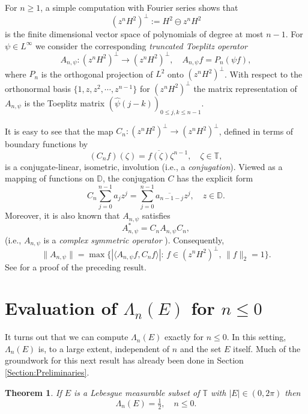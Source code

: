 \documentclass[11pt,reqno]{amsart}
\numberwithin{equation}{section}
\theoremstyle{plain}
\newtheorem{Theorem}[equation]{Theorem}
\theoremstyle{definition}
\begin{document}
	For $n \geq 1$, a simple computation with Fourier series shows that 
	$$(z^n H^2)^{\perp} := H^2 \ominus z^n H^2$$ is the finite dimensional vector space of  polynomials of degree at most $n - 1$. For $\psi \in L^{\infty}$ we consider the corresponding
	\emph{truncated Toeplitz operator}
$$A_{n, \psi}: (z^n H^2)^{\perp} \to (z^n H^2)^{\perp}, \quad A_{n, \psi} f = P_{n}(\psi f),$$
	where $P_{n}$ is the orthogonal projection of $L^2$ onto $(z^n H^2)^{\perp}$.   With respect to the  orthonormal basis $\{1, z, z^2, \cdots, z^{n- 1}\}$ for $(z^n H^2)^{\perp}$ the matrix representation of $A_{n, \psi}$ is the Toeplitz matrix $(\widehat{\psi}(j - k))_{0 \leq j, k \leq n  - 1}$.	
	
	It is easy to see that the map $C_n: (z^n H^2)^{\perp} \to (z^n H^2)^{\perp}$, defined in terms of boundary functions by
	\begin{equation*}
		(C_n f)(\zeta) = \overline{f(\zeta)} \zeta^{n - 1}, \quad \zeta \in {\mathbb{T}}, 
	\end{equation*}
	is a conjugate-linear, isometric, involution (i.e., a \emph{conjugation}).  
	Viewed as a mapping of functions on ${ \mathbb{D}}$, the conjugation $C$ has the explicit form 
	$$C_n \sum_{j = 0}^{n - 1} a_{j} z^j = \sum_{j = 0}^{n - 1} \overline{a_{n - 1 - j}} z^{j}, \quad z \in { \mathbb{D}}.$$
	Moreover, it is also known that
	$A_{n, \psi}$ satisfies 
	$$A_{n, \psi}^{*} = C_n A_{n, \psi} C_n,$$ (i.e., $A_{n, \psi}$ is a \emph{complex symmetric operator} \cite{G-P, G-P-II}).
	Consequently,
	\begin{equation*}
		\|A_{n, \psi}\| = \max\big\{|\langle A_{n, \psi} f, C_n f\rangle|: \,f \in (z^n H^2)^{\perp}, \,\|f\|_{2} = 1 \big\}.
	\end{equation*}
	See \cite{NLEPHS} for a proof of the preceding result.

\section{Evaluation of $\Lambda_{n}(E)$ for $n \leq 0$}\label{Section:Negative}

	It turns out that we can compute  $\Lambda_{n}(E)$ exactly for $n \leq 0$.  In this setting,
	$\Lambda_{n}(E)$ is, to a large extent, independent of $n$ and the set $E$ itself.
	Much of the groundwork for this next result has already been done in 
	 Section \ref{Section:Preliminaries}.
	
	\begin{Theorem}\label{Theorem:Main}
		If $E$ is a Lebesgue measurable subset of ${\mathbb{T}}$ with $|E| \in (0, 2 \pi)$ then
		\begin{equation*}
			\Lambda_{n}(E) = \tfrac{1}{2}, \quad n \leq 0.
		\end{equation*}
	\end{Theorem}
	
\end{document}
